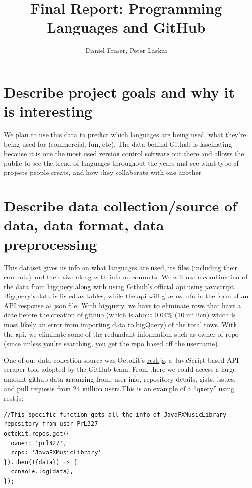\documentclass[11pt]{article}
\author{Daniel Fraser, Peter Laskai}
\title{Final Report: Programming Languages and
    	GitHub}
\begin{document}
    
    
    \maketitle
    


    \section{Describe project goals and why it is
interesting}\label{describe-project-goals-and-why-it-is-interesting}

We plan to use this data to predict which languages are being used, what
they're being used for (commercial, fun, etc). The data behind Github is
fascinating because it is one the most used version control software out
there and allows the public to see the trend of languages throughout the
years and see what type of projects people create, and how they
collaborate with one another.

    \section{Describe data collection/source of data, data format, data
preprocessing}\label{describe-data-collectionsource-of-data-data-format-data-preprocessing}

This dataset gives us info on what languages are used, its files
(including their contents) and their size along with info on commits. We
will use a combination of the data from bigquery along with using
Github's official api using javascript. Bigquery's data is listed as
tables, while the api will give us info in the form of an API response
as json file. With bigquery, we have to eliminate rows that have a date
before the creation of github (which is about 0.04\% (10 million) which
is most likely an error from importing data to bigQuery) of the total
rows. With the api, we eliminate some of the redundant information such
as owner of repo (since unless you're searching, you get the repo based
off the username).

One of our data collection source was Octokit's
\href{https://github.com/octokit/rest.js}{rest.js}, a JavaScript based
API scraper tool adopted by the GitHub team. From there we could access
a large amount github data arranging from, user info, repository
details, gists, issues, and pull requests from 24 million users.This is
an example of a ``query'' using rest.js:

\begin{verbatim}
//This specific function gets all the info of JavaFXMusicLibrary repository from user PrL327
octokit.repos.get({
  owner: 'prl327',
  repo: 'JavaFXMusicLibrary'
}).then(({data}) => {
  console.log(data);
}); 
\end{verbatim}
\end{document}
